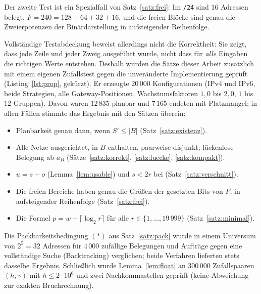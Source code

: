 Der zweite Test ist ein Spezialfall von Satz~\ref{satz:frei}: Im \texttt{/24} sind $16$ Adressen belegt, $F = 240 = 128 + 64 + 32 + 16$, und die freien Blöcke sind genau die Zweierpotenzen der Binärdarstellung in aufsteigender Reihenfolge.

Vollständige Testabdeckung beweist allerdings nicht die Korrektheit: Sie zeigt, dass jede Zeile und jeder Zweig ausgeführt wurde, nicht dass für \emph{alle} Eingaben die richtigen Werte entstehen. Deshalb wurden die Sätze dieser Arbeit zusätzlich mit einem eigenen Zufallstest gegen die unveränderte Implementierung geprüft (Listing~\ref{lst:prop}, gekürzt). Er erzeugte $20\,000$ Konfigurationen (IPv4 und IPv6, beide Strategien, alle Gateway-Positionen, Wachstumsfaktoren $1{,}0$ bis $2{,}0$, $1$ bis $12$ Gruppen). Davon waren $12\,835$ planbar und $7\,165$ endeten mit Platzmangel; in allen Fällen stimmte das Ergebnis mit den Sätzen überein:

\begin{itemize}
	\item Planbarkeit genau dann, wenn $S' \le |B|$ (Satz~\ref{satz:existenz}).
	\item Alle Netze ausgerichtet, in $B$ enthalten, paarweise disjunkt; lückenlose Belegung ab $a_B$ (Sätze~\ref{satz:korrekt}, \ref{satz:luecke}, \ref{satz:kompakt}).
	\item $u = s - o$ (Lemma~\ref{lem:usable}) und $s < 2r$ bei  (Satz~\ref{satz:verschnitt}).
	\item Die freien Bereiche haben genau die Größen der gesetzten Bits von $F$, in aufsteigender Reihenfolge (Satz~\ref{satz:frei}).
	\item Die Formel $p = w - \lceil\log_2 r\rceil$ für alle $r \in \{1,\ldots,19\,999\}$ (Satz~\ref{satz:minimal}).
\end{itemize}

Die Packbarkeitsbedingung $(\ast)$ aus Satz~\ref{satz:pack} wurde in einem Universum von $2^5 = 32$ Adressen für $4\,000$ zufällige Belegungen und Aufträge gegen eine vollständige Suche (Backtracking) verglichen; beide Verfahren lieferten stets dasselbe Ergebnis. Schließlich wurde Lemma~\ref{lem:float} an $300\,000$ Zufallspaaren $(h,\gamma)$ mit $h \le 2\cdot10^6$ und zwei Nachkommastellen geprüft (keine Abweichung zur exakten Bruchrechnung).

